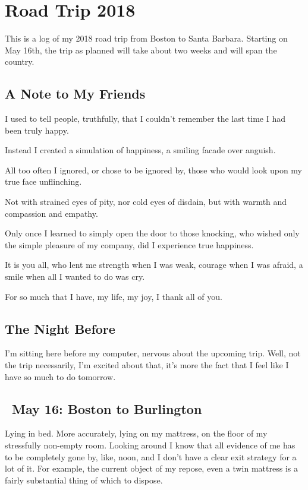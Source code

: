 \documentclass[../butidigress.tex]{subfiles}
\begin{document}
\newcommand{\entryskip}{\vspace*{\baselineskip}}

\chapter{Road Trip 2018}
\newpage
This is a log of my 2018 road trip from Boston to Santa Barbara.
Starting on May 16th, the trip as planned will take about two weeks and will span the country.

\section*{A Note to My Friends}
I used to tell people, truthfully, that I couldn't remember the last time I had been truly happy.

Instead I created a simulation of happiness, a smiling facade over anguish.

All too often I ignored, or chose to be ignored by, those who would look upon my true face unflinching.

Not with strained eyes of pity, nor cold eyes of disdain, but with warmth and compassion and empathy.

Only once I learned to simply open the door to those knocking, who wished only the simple pleasure of my company, did I experience true happiness.

\hspace*{2em} It is you all, who lent me strength when I was weak, courage when I was afraid, a smile when all I wanted to do was cry.

\hspace*{2em} For so much that I have, my life, my joy, I thank all of you.

\section*{The Night Before}
I'm sitting here before my computer, nervous about the upcoming trip.
Well, not the trip necessarily, I'm excited about that, it's more the fact that I feel like I have so much to do tomorrow.

\renewcommand{\thesection}{Day \arabic{section}\ }

\section{\ May 16: Boston to Burlington}
Lying in bed.
More accurately, lying on my mattress, on the floor of my stressfully non-empty room.
Looking around I know that all evidence of me has to be completely gone by, like, noon, and I don't have a clear exit strategy for a lot of it.
For example, the current object of my repose, even a twin mattress is a fairly substantial thing of which to dispose.
\end{document}
